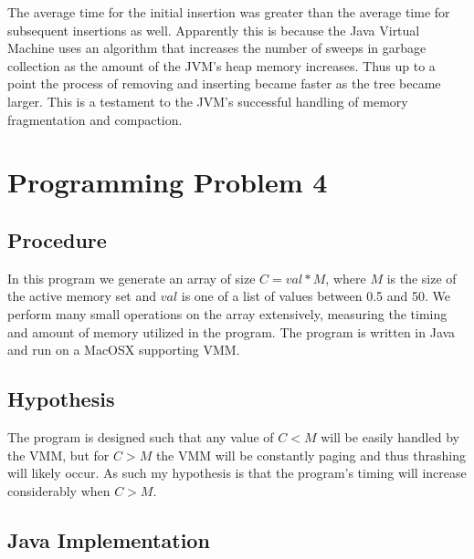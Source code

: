 \documentclass[11pt]{article}
\begin{document}
The average time for the initial insertion was greater than the average time for subsequent insertions as well. Apparently this is because the Java Virtual Machine uses an algorithm that increases the number of sweeps in garbage collection as the amount of the JVM's heap memory increases. Thus up to a point the process of removing and inserting became faster as the tree became larger. This is a testament to the JVM's successful handling of memory fragmentation and compaction.

\section*{Programming Problem 4}

\subsection*{Procedure}

In this program we generate an array of size $C=val*M$, where $M$ is the size of the active memory set and $val$ is one of a list of values between 0.5 and 50. We perform many small operations on the array extensively, measuring the timing and amount of memory utilized in the program. The program is written in Java and run on a MacOSX supporting VMM.

\subsection*{Hypothesis}

The program is designed such that any value of $C<M$ will be easily handled by the VMM, but for $C>M$ the VMM will be constantly paging and thus thrashing will likely occur. As such my hypothesis is that the program's timing will increase considerably when $C>M$.

\subsection*{Java Implementation}
\end{document}
